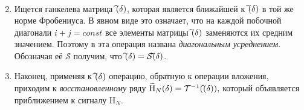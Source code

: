 \documentclass[specialist,
substylefile = spbu_report.rtx,
subf,href,colorlinks=true, 12pt]{disser}
\let\H\relax
\DeclareMathOperator\H{\mathbf{H}}
\DeclareMathOperator\tildeH{\widetilde{\mathrm{H}}}
\begin{document}
\begin{enumerate}
\begin{gather*}
		\end{gather*}
		\item
		Ищется ганкелева матрица  $\widehat{ \H}(\delta)$, которая является ближайшей к  $\widetilde{ \H}(\delta)$ в той же норме
		Фробениуса.
		В явном виде это означает, что на каждой побочной диагонали $i+j=const$ все элементы матрицы $\widetilde{ \H}(\delta)$ заменяются их
		средним значением. Поэтому
		в \cite{GNZh01} эта операция названа {\it диагональным усреднением}. Обозначая её $\mathcal{S}$ получим, что   $\widehat{\H}(\delta)=\mathcal{S} \widetilde{ \H}(\delta)$.
		\item
		Наконец, применяя к $\widehat{ \H}(\delta)$ операцию, обратную к операции вложения, приходим к {\it восстановленному} ряду $\tildeH_{N}(\delta)=\mathcal{T}^{-1}(\widehat{\H}(\delta)),$
		который объявляется приближением к сигналу $\mathrm{H}_N$.
	\end{enumerate}
\end{document}
